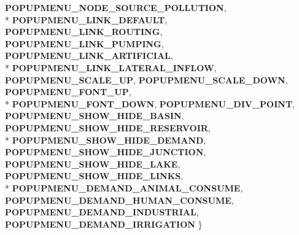\begin{DoxyCompactItemize}
$${\bf P\+O\+P\+U\+P\+M\+E\+N\+U\+\_\+\+N\+O\+D\+E\+\_\+\+S\+O\+U\+R\+C\+E\+\_\+\+P\+O\+L\+L\+U\+T\+I\+ON}, 
\\*
{\bf P\+O\+P\+U\+P\+M\+E\+N\+U\+\_\+\+L\+I\+N\+K\+\_\+\+D\+E\+F\+A\+U\+LT}, 
{\bf P\+O\+P\+U\+P\+M\+E\+N\+U\+\_\+\+L\+I\+N\+K\+\_\+\+R\+O\+U\+T\+I\+NG}, 
{\bf P\+O\+P\+U\+P\+M\+E\+N\+U\+\_\+\+L\+I\+N\+K\+\_\+\+P\+U\+M\+P\+I\+NG}, 
{\bf P\+O\+P\+U\+P\+M\+E\+N\+U\+\_\+\+L\+I\+N\+K\+\_\+\+A\+R\+T\+I\+F\+I\+C\+I\+AL}, 
\\*
{\bf P\+O\+P\+U\+P\+M\+E\+N\+U\+\_\+\+L\+I\+N\+K\+\_\+\+L\+A\+T\+E\+R\+A\+L\+\_\+\+I\+N\+F\+L\+OW}, 
{\bf P\+O\+P\+U\+P\+M\+E\+N\+U\+\_\+\+S\+C\+A\+L\+E\+\_\+\+UP}, 
{\bf P\+O\+P\+U\+P\+M\+E\+N\+U\+\_\+\+S\+C\+A\+L\+E\+\_\+\+D\+O\+WN}, 
{\bf P\+O\+P\+U\+P\+M\+E\+N\+U\+\_\+\+F\+O\+N\+T\+\_\+\+UP}, 
\\*
{\bf P\+O\+P\+U\+P\+M\+E\+N\+U\+\_\+\+F\+O\+N\+T\+\_\+\+D\+O\+WN}, 
{\bf P\+O\+P\+U\+P\+M\+E\+N\+U\+\_\+\+D\+I\+V\+\_\+\+P\+O\+I\+NT}, 
{\bf P\+O\+P\+U\+P\+M\+E\+N\+U\+\_\+\+S\+H\+O\+W\+\_\+\+H\+I\+D\+E\+\_\+\+B\+A\+S\+IN}, 
{\bf P\+O\+P\+U\+P\+M\+E\+N\+U\+\_\+\+S\+H\+O\+W\+\_\+\+H\+I\+D\+E\+\_\+\+R\+E\+S\+E\+R\+V\+O\+IR}, 
\\*
{\bf P\+O\+P\+U\+P\+M\+E\+N\+U\+\_\+\+S\+H\+O\+W\+\_\+\+H\+I\+D\+E\+\_\+\+D\+E\+M\+A\+ND}, 
{\bf P\+O\+P\+U\+P\+M\+E\+N\+U\+\_\+\+S\+H\+O\+W\+\_\+\+H\+I\+D\+E\+\_\+\+J\+U\+N\+C\+T\+I\+ON}, 
{\bf P\+O\+P\+U\+P\+M\+E\+N\+U\+\_\+\+S\+H\+O\+W\+\_\+\+H\+I\+D\+E\+\_\+\+L\+A\+KE}, 
{\bf P\+O\+P\+U\+P\+M\+E\+N\+U\+\_\+\+S\+H\+O\+W\+\_\+\+H\+I\+D\+E\+\_\+\+L\+I\+N\+KS}, 
\\*
{\bf P\+O\+P\+U\+P\+M\+E\+N\+U\+\_\+\+D\+E\+M\+A\+N\+D\+\_\+\+A\+N\+I\+M\+A\+L\+\_\+\+C\+O\+N\+S\+U\+ME}, 
{\bf P\+O\+P\+U\+P\+M\+E\+N\+U\+\_\+\+D\+E\+M\+A\+N\+D\+\_\+\+H\+U\+M\+A\+N\+\_\+\+C\+O\+N\+S\+U\+ME}, 
{\bf P\+O\+P\+U\+P\+M\+E\+N\+U\+\_\+\+D\+E\+M\+A\+N\+D\+\_\+\+I\+N\+D\+U\+S\+T\+R\+I\+AL}, 
{\bf P\+O\+P\+U\+P\+M\+E\+N\+U\+\_\+\+D\+E\+M\+A\+N\+D\+\_\+\+I\+R\+R\+I\+G\+A\+T\+I\+ON}
 \}
\end{DoxyCompactItemize}

